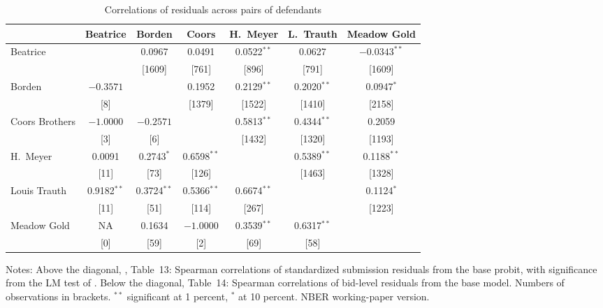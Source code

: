 \begin{table}[htbp]
\centering
\caption{Correlations of residuals across pairs of defendants}\label{tab:13-pz99-corr}
\small
\setlength{\tabcolsep}{4.5pt}
\begin{tabular}{@{}lcccccc@{}}
\toprule
 & Beatrice & Borden & Coors & H.~Meyer & L.~Trauth & Meadow Gold\\
\midrule
Beatrice       &  & 0.0967 & 0.0491 & 0.0522$^{**}$ & 0.0627 & $-0.0343^{**}$\\
               &  & [1609] & [761] & [896] & [791] & [1609]\\
Borden         & $-0.3571$ &  & 0.1952 & 0.2129$^{**}$ & 0.2020$^{**}$ & 0.0947$^{*}$\\
               & [8] &  & [1379] & [1522] & [1410] & [2158]\\
Coors Brothers & $-1.0000$ & $-0.2571$ &  & 0.5813$^{**}$ & 0.4344$^{**}$ & 0.2059\\
               & [3] & [6] &  & [1432] & [1320] & [1193]\\
H.~Meyer       & 0.0091 & 0.2743$^{*}$ & 0.6598$^{**}$ &  & 0.5389$^{**}$ & 0.1188$^{**}$\\
               & [11] & [73] & [126] &  & [1463] & [1328]\\
Louis Trauth   & 0.9182$^{**}$ & 0.3724$^{**}$ & 0.5366$^{**}$ & 0.6674$^{**}$ &  & 0.1124$^{*}$\\
               & [11] & [51] & [114] & [267] &  & [1223]\\
Meadow Gold    & NA & 0.1634 & $-1.0000$ & 0.3539$^{**}$ & 0.6317$^{**}$ & \\
               & [0] & [59] & [2] & [69] & [58] & \\
\bottomrule
\end{tabular}

\smallskip
\begin{minipage}{0.95\textwidth}\footnotesize
Notes: Above the diagonal, \citet{PorterZona1999}, Table~13: Spearman correlations of standardized submission
residuals from the base probit, with significance from the LM test of \citet{Kiefer1982}. Below the diagonal,
Table~14: Spearman correlations of bid-level residuals from the base model. Numbers of observations in brackets.
$^{**}$ significant at 1 percent, $^{*}$ at 10 percent. NBER working-paper version.
\end{minipage}
\end{table}


